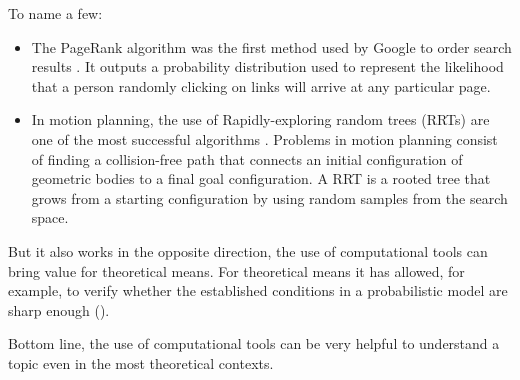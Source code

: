 To name a few:
\begin{itemize}
\item The PageRank algorithm was the first method used by Google to order search results \cite[Page 99]{pageRank}. It outputs a probability distribution used to represent the likelihood that a person randomly clicking on links will arrive at any particular page.
\item In motion planning, the use of Rapidly-exploring random trees (RRTs) are one of the most successful algorithms \cite[Alcazar 15]{Alcazar15}. Problems in motion planning consist of finding a collision-free path that connects an initial configuration of geometric bodies to a final goal configuration. A RRT is a rooted tree that grows from a starting configuration by using random samples from the search space.
\end{itemize}

But it also works in the opposite direction, the use of computational tools can bring value for theoretical means. For theoretical means it has allowed, for example, to verify whether the established conditions in a probabilistic model are sharp enough (\cite[Aronshtam 13]{Meshulam13}).

Bottom line, the use of computational tools can be very helpful to understand a topic even in the most theoretical contexts.